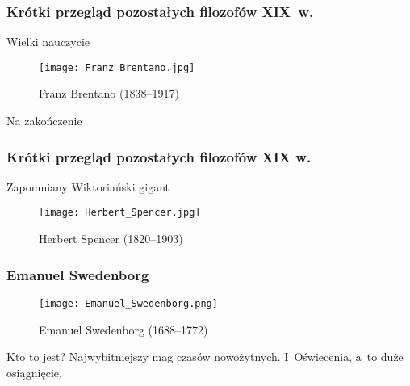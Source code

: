 \documentclass{beamer}  %
\begin{document}
\begin{frame}
  \frametitle{Krótki przegląd pozostałych filozofów XIX~w.}

  \begin{block}{Wielki nauczycie}
    \begin{figure}
      \centering

      \texttt{[image: Franz\_Brentano.jpg]}

      \caption{Franz Brentano (1838--1917)}
    \end{figure}
  \end{block}

\end{frame}



\begin{frame}{Na zakończenie}
  \frametitle{Krótki przegląd pozostałych filozofów XIX w.}

  \begin{block}{Zapomniany Wiktoriański gigant}
    \begin{figure}
      \centering

      \texttt{[image: Herbert\_Spencer.jpg]}

      \caption{Herbert Spencer (1820--1903)}
    \end{figure}
  \end{block}

\end{frame}



\begin{frame}
  \frametitle{Emanuel Swedenborg}
  \begin{block}{}
    \begin{figure}
      \centering

      \texttt{[image: Emanuel\_Swedenborg.png]}

      \caption{Emanuel Swedenborg (1688--1772)}
    \end{figure}
  \end{block}

  \begin{block}{Kto to jest?}
    Najwybitniejszy mag czasów nowożytnych. I~Oświecenia, a~to duże
    osiągnięcie.
  \end{block}

\end{frame}
\end{document}

